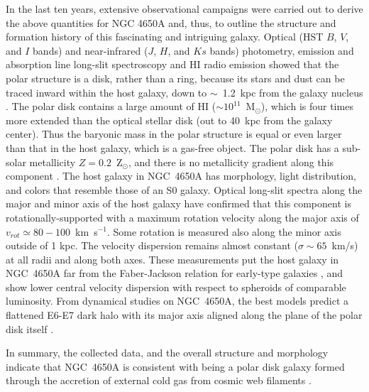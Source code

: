 \documentclass{aa}
\begin{document}
In the last ten years, extensive observational campaigns were carried
out to derive the above quantities for NGC 4650A and, thus, to outline
the structure and formation history of this fascinating and intriguing
galaxy.  Optical (HST $B$, $V$, and $I$ bands) and near-infrared ($J$,
$H$, and $Ks$ bands) photometry, emission and absorption line long-slit
spectroscopy and HI radio emission showed that the polar structure is
a disk, rather than a ring, because its stars and dust can be traced
inward within the host galaxy, down to $\sim$~1.2~kpc from the galaxy
nucleus \citep{Arnaboldi1997, Iodice+02, Gallagher2002, Swaters2003}.
The polar disk contains a large amount of HI ($\sim
10^{11}$~M$_{\odot}$), which is four times more extended than the
optical stellar disk (out to 40~kpc from the galaxy center). Thus the
baryonic mass in the polar structure is equal or even larger than that
in the host galaxy, which is a gas-free object. The polar disk has a
sub-solar metallicity $Z = 0.2$~Z$_{\odot}$, and there is no
metallicity gradient along this component \citep{Spavone+2010}.  The
host galaxy in NGC~4650A has morphology, light distribution, and colors
that resemble those of an S0 galaxy.  Optical long-slit spectra along
the major and minor axis of the host galaxy \citep{Iodice+06} have
confirmed that this component is rotationally-supported with a
maximum rotation velocity along the major axis of $v_{rot} \simeq 80 -
100$~km~s$^{-1}$. Some rotation is measured also along the minor axis
outside of 1 kpc.  The velocity dispersion remains almost constant
($\sigma \sim 65$~km/s) at all radii and along both axes. These
measurements put the host galaxy in NGC~4650A far from the
Faber-Jackson relation for early-type galaxies
\citep[see][]{Iodice+06, Iodice2014}, and show lower central velocity
dispersion with respect to spheroids of comparable luminosity.  From
dynamical studies on NGC~4650A, the best models predict a flattened
E6-E7 dark halo with its major axis aligned along the plane of the
polar disk itself \citep{CA1996, Nap2014}.

 In summary, the collected data, and the overall structure and
  morphology indicate that NGC~4650A is consistent with being a polar
  disk galaxy formed through the accretion of external cold gas from
  cosmic web filaments \citep[see][]{Spavone+2010}.
\end{document}
